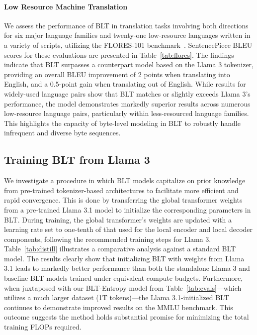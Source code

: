 \paragraph{Low Resource Machine Translation} We assess the performance of {\textsc BLT} in translation tasks involving both directions for six major language families and twenty-one low-resource languages written in a variety of scripts, utilizing the FLORES-101 benchmark~\citep{goyal2022flores}. SentencePiece BLEU scores for these evaluations are presented in Table~\ref{tab:flores}. 
The findings indicate that {\textsc BLT} surpasses a counterpart model based on the Llama 3 tokenizer, providing an overall BLEU improvement of 2 points when translating into English, and a 0.5-point gain when translating out of English. While results for widely-used language pairs show that {\textsc BLT} matches or slightly exceeds Llama 3’s performance, the model demonstrates markedly superior results across numerous low-resource language pairs, particularly within less-resourced language families. This highlights the capacity of byte-level modeling in {\textsc BLT} to robustly handle infrequent and diverse byte sequences.

\subsection{Training {\textsc BLT} from Llama 3}
\label{sec:distillation}
We investigate a procedure in which {\textsc BLT} models capitalize on prior knowledge from pre-trained tokenizer-based architectures to facilitate more efficient and rapid convergence. This is done by transferring the global transformer weights from a pre-trained Llama 3.1 model to initialize the corresponding parameters in {\textsc BLT}. During training, the global transformer’s weights are updated with a learning rate set to one-tenth of that used for the local encoder and local decoder components, following the recommended training steps for Llama 3. Table~\ref{tab:distill} illustrates a comparative analysis against a standard {\textsc BLT} model. The results clearly show that initializing {\textsc BLT} with weights from Llama 3.1 leads to markedly better performance than both the standalone Llama 3 and baseline {\textsc BLT} models trained under equivalent compute budgets. Furthermore, when juxtaposed with our {\textsc BLT}-Entropy model from Table~\ref{tab:evals}—which utilizes a much larger dataset (1T tokens)—the Llama 3.1-initialized {\textsc BLT} continues to demonstrate improved results on the MMLU benchmark. This outcome suggests the method holds substantial promise for minimizing the total training FLOPs required.

